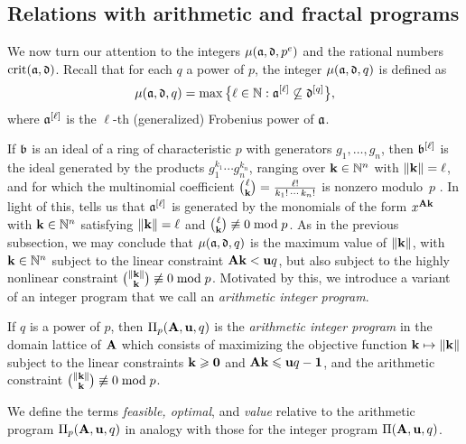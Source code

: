 \documentclass{amsart}
\begin{document}
\subsection{Relations with arithmetic and fractal programs}

We now turn our attention to the integers $\mu(\mathfrak{a}, \mathfrak{d}, p^e)$ and the rational numbers $\operatorname{crit}(\mathfrak{a},\mathfrak{d})$.
Recall that for each $q$ a power of $p$, the integer $\mu(\mathfrak{a}, \mathfrak{d}, q)$ is defined as
\[\mu(\mathfrak{a},\mathfrak{d},q) = \max\big\{ \ell \in \mathbb{N} : \mathfrak{a}^{[\ell]} \not\subseteq \mathfrak{d}^{[q]}\big\},\]
where $\mathfrak{a}^{[\ell]}$ is the $\ell$-th (generalized) Frobenius power of $\mathfrak{a}$.

If $\mathfrak{b}$ is an ideal of a ring of characteristic $p$ with generators $g_1, \ldots, g_n$, then $\mathfrak{b}^{[\ell]}$ is the ideal generated by the products $g_1^{k_1}\cdots g_n^{k_n}$, ranging over $\mathbf{k} \in \mathbb{N}^n$ with $\| \mathbf{k} \|=\ell$, and for which the multinomial coefficient $\binom{\ell}{\mathbf{k}} =
\frac{\ell!}{k_1 !\, \cdots\, k_n !}$ is nonzero modulo~$p$ \cite[Proposition~3.5]{hernandez+etal.frobenius_powers}.
In light of this,  tells us that $\mathfrak{a}^{[\ell]}$ is generated by the monomials of the form $x^{\mathbf{A} \mathbf{k}}$ with $\mathbf{k} \in \mathbb{N}^n$ satisfying $\| \mathbf{k} \|=\ell$ and $\binom{\ell}{\mathbf{k}} \not\equiv 0 \bmod p$.  As in the previous subsection, we may conclude that $\mu(\mathfrak{a},\mathfrak{d},q)$ is the maximum value of $\| \mathbf{k} \|$, with $\mathbf{k} \in \mathbb{N}^n$ subject to the linear constraint $\mathbf{A}\mathbf{k} < \mathbf{u}q$, but also subject to the highly nonlinear constraint $\binom{\| \mathbf{k} \|}{\mathbf{k}} \not\equiv 0 \bmod{p}$.  Motivated by this, we introduce a variant of an integer program that we call an \emph{arithmetic integer program}.

\begin{definition}
\label{aip: D}
If $q$ is a power of $p$, then $\Pi_p(\mathbf{A}, \mathbf{u}, q)$ is the \emph{arithmetic integer program} in the domain lattice of $\mathbf{A}$ which consists of maximizing the objective function $\mathbf{k} \mapsto \| \mathbf{k} \|$ subject to the linear constraints $\mathbf{k} \geqslant \mathbf{0}$ and $\mathbf{A} \mathbf{k} \leqslant \mathbf{u}q - \mathbf{1}$, and the arithmetic constraint $\binom{\| \mathbf{k} \|}{\mathbf{k}} \not \equiv 0 \bmod p$.
\end{definition}

We define the terms \emph{feasible, optimal}, and \emph{value} relative to the arithmetic program $\Pi_p(\mathbf{A}, \mathbf{u}, q)$ in analogy with those for the integer program $\Pi(\mathbf{A}, \mathbf{u}, q)$.
\end{document}
